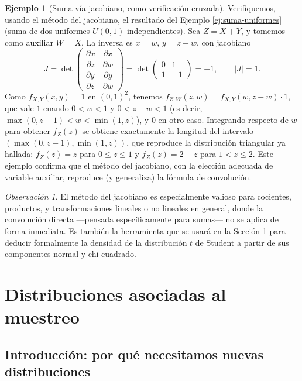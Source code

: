 \documentclass[11pt,a4paper]{article}
\theoremstyle{plain}
\theoremstyle{definition}
\newtheorem{ejemplo}[teorema]{Ejemplo}
\theoremstyle{remark}
\newtheorem{observacion}[teorema]{Observación}
\begin{document}
\begin{ejemplo}[Suma vía jacobiano, como verificación cruzada]\label{ej:suma-jacobiano}
Verifiquemos, usando el método del jacobiano, el resultado del Ejemplo \ref{ej:suma-uniformes} (suma de dos uniformes $U(0,1)$ independientes). Sea $Z=X+Y$, y tomemos como auxiliar $W=X$. La inversa es $x=w$, $y=z-w$, con jacobiano
\[
J = \det\begin{pmatrix}\dfrac{\partial x}{\partial z} & \dfrac{\partial x}{\partial w} \\ \dfrac{\partial y}{\partial z} & \dfrac{\partial y}{\partial w}\end{pmatrix} = \det\begin{pmatrix} 0 & 1 \\ 1 & -1\end{pmatrix} = -1, \qquad |J|=1.
\]
Como $f_{X,Y}(x,y)=1$ en $(0,1)^2$, tenemos $f_{Z,W}(z,w) = f_{X,Y}(w,z-w)\cdot1$, que vale $1$ cuando $0<w<1$ y $0<z-w<1$ (es decir, $\max(0,z-1)<w<\min(1,z)$), y $0$ en otro caso. Integrando respecto de $w$ para obtener $f_Z(z)$ se obtiene exactamente la longitud del intervalo $(\max(0,z-1),\min(1,z))$, que reproduce la distribución triangular ya hallada: $f_Z(z)=z$ para $0\le z\le1$ y $f_Z(z)=2-z$ para $1<z\le2$. Este ejemplo confirma que el método del jacobiano, con la elección adecuada de variable auxiliar, reproduce (y generaliza) la fórmula de convolución.
\end{ejemplo}

\begin{observacion}
El método del jacobiano es especialmente valioso para cocientes, productos, y transformaciones lineales o no lineales en general, donde la convolución directa —pensada específicamente para sumas— no se aplica de forma inmediata. Es también la herramienta que se usará en la Sección \ref{sec:muestreo} para deducir formalmente la densidad de la distribución $t$ de Student a partir de sus componentes normal y chi-cuadrado.
\end{observacion}

\section{Distribuciones asociadas al muestreo}\label{sec:muestreo}

\subsection{Introducción: por qué necesitamos nuevas distribuciones}
\end{document}

